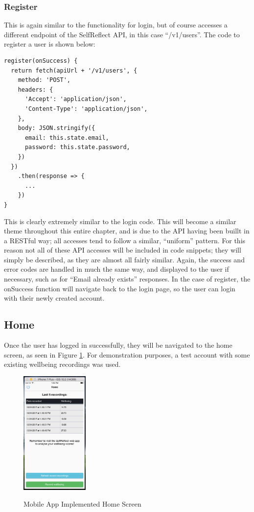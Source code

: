 \documentclass[11pt,openright,a4paper]{report}
\begin{document}
\newpage
\subsubsection{Register}
This is again similar to the functionality for login, but of course accesses a different endpoint of the SelfReflect API, in this case \enquote{/v1/users}. The code to register a user is shown below:
\begin{lstlisting}
register(onSuccess) {
  return fetch(apiUrl + '/v1/users', {
    method: 'POST',
    headers: {
      'Accept': 'application/json',
      'Content-Type': 'application/json',
    },
    body: JSON.stringify({
      email: this.state.email,
      password: this.state.password,
    })
  })
    .then(response => {
      ...
    })
}
\end{lstlisting}

This is clearly extremely similar to the login code. This will become a similar theme throughout this entire chapter, and is due to the API having been buillt in a RESTful way; all accesses tend to follow a similar, \enquote{uniform} pattern. For this reason not all of these API accesses will be included in code snippets; they will simply be described, as they are almost all fairly similar. Again, the success and error codes are handled in much the same way, and displayed to the user if necessary, such as for \enquote{Email already exists} responses. In the case of register, the onSuccess function will navigate back to the login page, so the user can login with their newly created account.

\subsection{Home}
Once the user has logged in successfully, they will be navigated to the home screen, as seen in Figure \ref{fig:mobilehomeimpl}. For demonstration purposes, a test account with some existing wellbeing recordings was used.

\begin{figure}[ht]
\centering
\caption{Mobile App Implemented Home Screen}
\includegraphics[width=0.3\textwidth]{i/mobilehomeimpl.png}
\label{fig:mobilehomeimpl}
\end{figure}
\end{document}
